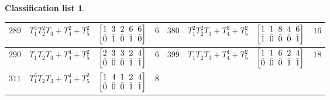 \documentclass[10pt,a4paper]{amsart}
\theoremstyle{definition}
\newtheorem{class-list}[thm]{Classification list}
\numberwithin{equation}{section}
\begin{document}
\begin{class-list}
\begin{table}[h!]
\begin{tabu}{c|c|c|c||c|c|c|c}
\\
\hline
${289}$&${T_{1}^{4}T_{2}^{2}T_{3}+T_{4}^{2}+T_{5}^{2}}$
&$\arraycolsep=1mm\begin{bmatrix}{1} & {3} & {2} & {6} & {6} \\ {\bar{0}} & {\bar{1}} & {\bar{0}} & {\bar{1}} & {\bar{0}}\end{bmatrix}$&${6}$
&${380}$&${T_{1}^{2}T_{2}^{2}T_{3}+T_{4}^{3}+T_{5}^{2}}$
&$\arraycolsep=1mm\begin{bmatrix}{1} & {1} & {8} & {4} & {6} \\ {\bar{1}} & {\bar{0}} & {\bar{0}} & {\bar{0}} & {\bar{1}}\end{bmatrix}$&${16}$
\\
\hline
${290}$&${T_{1}T_{2}T_{3}+T_{4}^{4}+T_{5}^{2}}$
&$\arraycolsep=1mm\begin{bmatrix}{2} & {3} & {3} & {2} & {4} \\ {\bar{0}} & {\bar{0}} & {\bar{0}} & {\bar{1}} & {\bar{1}}\end{bmatrix}$&${6}$
&${399}$&${T_{1}T_{2}T_{3}+T_{4}^{4}+T_{5}^{2}}$
&$\arraycolsep=1mm\begin{bmatrix}{1} & {1} & {6} & {2} & {4} \\ {\bar{0}} & {\bar{0}} & {\bar{0}} & {\bar{1}} & {\bar{1}}\end{bmatrix}$&${18}$\\
\hline
${311}$&${T_{1}^{3}T_{2}T_{3}+T_{4}^{4}+T_{5}^{2}}$
&$\arraycolsep=1mm\begin{bmatrix}{1} & {4} & {1} & {2} & {4} \\ {\bar{0}} & {\bar{0}} & {\bar{0}} & {\bar{1}} & {\bar{1}}\end{bmatrix}$&${8}$
\\
\end{tabu}%
\end{table}
\end{class-list}

\newpage
\end{document}
